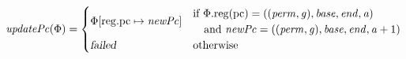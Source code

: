 \documentclass[a4paper]{article}
\newcommand{\update}[2]{[#1 \mapsto #2]}
\newcommand{\var}[1]{\mathit{#1}}
\newcommand{\gl}{\var{g}}
\newcommand{\pcreg}{\mathrm{pc}}
\newcommand{\addr}{\var{a}}
\newcommand{\start}{\var{base}}
\newcommand{\addrend}{\var{end}}
\newcommand{\perm}{\var{perm}}
\newcommand{\stdcap}[1][(\perm,\gl)]{\left(#1,\start,\addrend,\addr \right)}
\newcommand{\plainproj}[1]{\mathrm{#1}}
\newcommand{\memreg}[1][\Phi]{#1.\plainproj{reg}}
\newcommand{\updateReg}[3][\Phi]{#1\update{\plainproj{reg}.#2}{#3}}
\newcommand{\failed}{\textsl{failed}}
\newcommand{\plainfun}[2]{
  \ifthenelse{\equal{#2}{}}
             {\mathit{#1}}
             {\mathit{#1}(#2)}
}
\newcommand{\stdUpdatePc}[1]{\plainfun{updatePc}{#1}}
\begin{document}
\begin{align*}
  \stdUpdatePc{\Phi} &=
                       \begin{cases}
                         \updateReg{\pcreg}{\var{newPc}} & 
                           \arraycolsep=0pt
                           \begin{array}{l}
                             \text{if $\memreg(\pcreg) = \stdcap$}\\
                             \quad\text{and $\var{newPc} = ((\perm,\gl),\start,\addrend,\addr + 1)$}\\
                           \end{array} \\
                           \failed & \text{otherwise}
                       \end{cases} \\
\end{align*}
\end{document}
